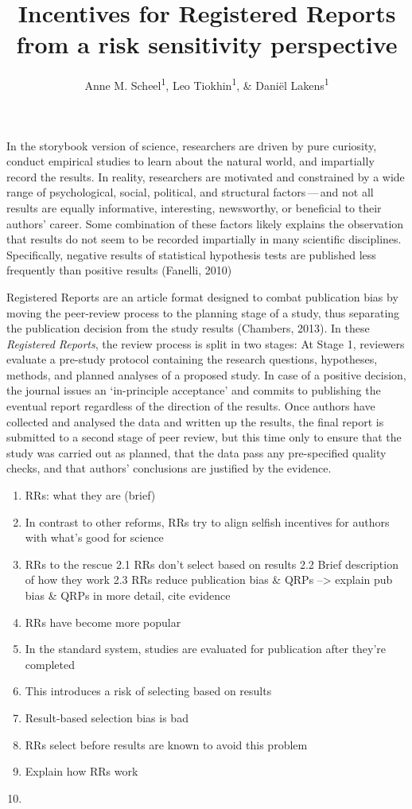 \documentclass[
  ,man,mask,floatsintext]{apa6}
\title{Incentives for Registered Reports from a risk sensitivity perspective}
\author{Anne M. Scheel\textsuperscript{1}, Leo Tiokhin\textsuperscript{1}, \& Daniël Lakens\textsuperscript{1}}
\date{}
\affiliation{\vspace{0.5cm}\textsuperscript{1} Eindhoven University of Technology}
\begin{document}
\maketitle

In the storybook version of science, researchers are driven by pure curiosity, conduct empirical studies to learn about the natural world, and impartially record the results.
In reality, researchers are motivated and constrained by a wide range of psychological, social, political, and structural factors\(\,\)---\(\,\)and not all results are equally informative, interesting, newsworthy, or beneficial to their authors' career.
Some combination of these factors likely explains the observation that results do not seem to be recorded impartially in many scientific disciplines.
Specifically, negative results of statistical hypothesis tests are published less frequently than positive results (Fanelli, 2010)

Registered Reports are an article format designed to combat publication bias by moving the peer-review process to the planning stage of a study, thus separating the publication decision from the study results (Chambers, 2013).
In these \emph{Registered Reports}, the review process is split in two stages:
At Stage 1, reviewers evaluate a pre-study protocol containing the research questions, hypotheses, methods, and planned analyses of a proposed study.
In case of a positive decision, the journal issues an `in-principle acceptance' and commits to publishing the eventual report regardless of the direction of the results.
Once authors have collected and analysed the data and written up the results, the final report is submitted to a second stage of peer review, but this time only to ensure that the study was carried out as planned, that the data pass any pre-specified quality checks, and that authors' conclusions are justified by the evidence.

\begin{enumerate}
\def\labelenumi{\arabic{enumi}.}
\item
  RRs: what they are (brief)
\item
  In contrast to other reforms, RRs try to align selfish incentives for authors with what's good for science
\item
  RRs to the rescue
  2.1 RRs don't select based on results
  2.2 Brief description of how they work
  2.3 RRs reduce publication bias \& QRPs
  --\textgreater{} explain pub bias \& QRPs in more detail, cite evidence
\item
  RRs have become more popular
\item
  In the standard system, studies are evaluated for publication after they're completed
\item
  This introduces a risk of selecting based on results
\item
  Result-based selection bias is bad
\item
  RRs select before results are known to avoid this problem
\item
  Explain how RRs work
\item
\end{enumerate}
\end{document}
